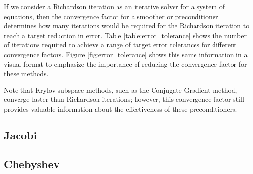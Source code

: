 If we consider a Richardson iteration as an iterative solver for a system of equations, then the convergence factor for a smoother or preconditioner determines how many iterations would be required for the Richardson iteration to reach a target reduction in error.
Table \ref{table:error_tolerance} shows the number of iterations required to achieve a range of target error tolerances for different convergence factors.
Figure \ref{fig:error_tolerance} shows this same information in a visual format to emphasize the importance of reducing the convergence factor for these methods.

Note that Krylov subspace methods, such as the Conjugate Gradient method, converge faster than Richardson iterations; however, this convergence factor still provides valuable information about the effectiveness of these preconditioners.

\subsection{Jacobi}


\subsection{Chebyshev}

